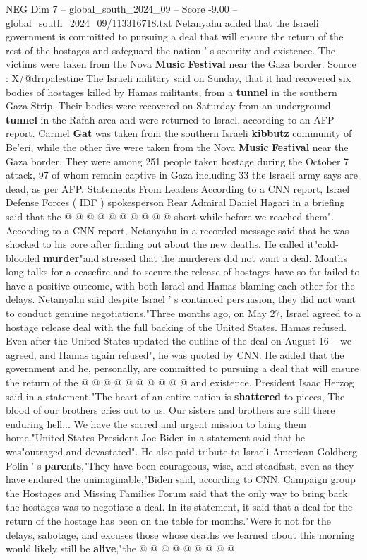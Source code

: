 \begin{textsample}{NEG Dim 7 – global\_south\_2024\_09 – Score -9.00 – global\_south\_2024\_09/113316718.txt}  \label{ex:f7_neg_173}
Netanyahu added that the Israeli government is committed to pursuing a deal that will ensure the return of the rest of the hostages and safeguard the nation ' s security and existence.
The victims were taken from the Nova \textbf{Music} \textbf{Festival} near the Gaza border.
Source : X/@drrpalestine The Israeli military said on Sunday, that it had recovered six bodies of hostages killed by Hamas militants, from a \textbf{tunnel} in the southern Gaza Strip.
Their bodies were recovered on Saturday from an underground \textbf{tunnel} in the Rafah area and were returned to Israel, according to an AFP report.
Carmel \textbf{Gat} was taken from the southern Israeli \textbf{kibbutz} community of Be'eri, while the other five were taken from the Nova \textbf{Music} \textbf{Festival} near the Gaza border.
They were among 251 people taken hostage during the October 7 attack, 97 of whom remain captive in Gaza including 33 the Israeli army says are dead, as per AFP.
Statements From Leaders According to a CNN report, Israel Defense Forces ( IDF ) spokesperson Rear Admiral Daniel Hagari in a briefing said that the @ @ @ @ @ @ @ @ @ @ short while before we reached them".
According to a CNN report, Netanyahu in a recorded message said that he was shocked to his core after finding out about the new deaths.
He called it"cold-blooded \textbf{murder}"and stressed that the murderers did not want a deal.
Months long talks for a ceasefire and to secure the release of hostages have so far failed to have a positive outcome, with both Israel and Hamas blaming each other for the delays.
Netanyahu said despite Israel ' s continued persuasion, they did not want to conduct genuine negotiations."Three months ago, on May 27, Israel agreed to a hostage release deal with the full backing of the United States.
Hamas refused.
Even after the United States updated the outline of the deal on August 16 -- we agreed, and Hamas again refused", he was quoted by CNN.
He added that the government and he, personally, are committed to pursuing a deal that will ensure the return of the @ @ @ @ @ @ @ @ @ @ and existence.
President Isaac Herzog said in a statement."The heart of an entire nation is \textbf{shattered} to pieces, The blood of our brothers cries out to us.
Our sisters and brothers are still there enduring hell...
We have the sacred and urgent mission to bring them home."United States President Joe Biden in a statement said that he was"outraged and devastated".
He also paid tribute to Israeli-American Goldberg-Polin ' s \textbf{parents},"They have been courageous, wise, and steadfast, even as they have endured the unimaginable,"Biden said, according to CNN.
Campaign group the Hostages and Missing Families Forum said that the only way to bring back the hostages was to negotiate a deal.
In its statement, it said that a deal for the return of the hostage has been on the table for months."Were it not for the delays, sabotage, and excuses those whose deaths we learned about this morning would likely still be \textbf{alive},"the @ @ @ @ @ @ @ @ @

\end{textsample}
